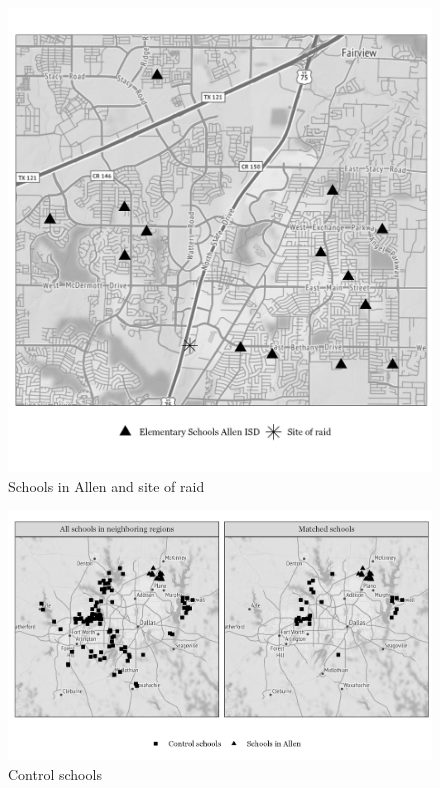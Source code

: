 \documentclass[hidelinks,twoside]{article}
\begin{document}
\begin{figure}[!ht]
\caption{{Schools in Allen and site of raid}}
\centerline{\includegraphics[scale=0.5]{allen_school_map.png}}
\end{figure}

\begin{figure}[!ht]
\caption{{Control schools}}
\centerline{\includegraphics[scale=0.7]{treated_control_school_map.png}}
\end{figure}
\end{document}
